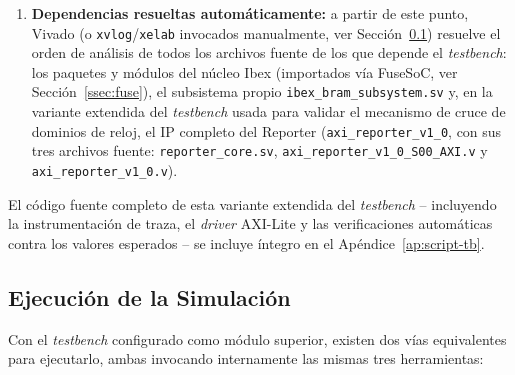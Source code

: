 \begin{enumerate}
    \item \textbf{Dependencias resueltas automáticamente:} a partir de este
    punto, Vivado (o \texttt{xvlog}/\texttt{xelab} invocados manualmente,
    ver Sección~\ref{ssec:ejecucion_xsim}) resuelve el orden de análisis de
    todos los archivos fuente de los que depende el \textit{testbench}: los
    paquetes y módulos del núcleo Ibex (importados vía FuseSoC, ver
    Sección~\ref{ssec:fuse}), el subsistema propio
    \texttt{ibex\_bram\_subsystem.sv} y, en la variante extendida del
    \textit{testbench} usada para validar el mecanismo de cruce de
    dominios de reloj, el IP completo del Reporter
    (\texttt{axi\_reporter\_v1\_0}, con sus tres archivos fuente:
    \texttt{reporter\_core.sv}, \texttt{axi\_reporter\_v1\_0\_S00\_AXI.v}
    y \texttt{axi\_reporter\_v1\_0.v}).
\end{enumerate}
El código fuente completo de esta variante extendida del \textit{testbench} -- incluyendo la instrumentación de traza, el \textit{driver} AXI-Lite y las verificaciones automáticas contra los
    valores esperados -- se incluye íntegro en el Apéndice~\ref{ap:script-tb}.

\subsection{Ejecución de la Simulación}
\label{ssec:ejecucion_xsim}

Con el \textit{testbench} configurado como módulo superior, existen dos
vías equivalentes para ejecutarlo, ambas invocando internamente las mismas
tres herramientas:

